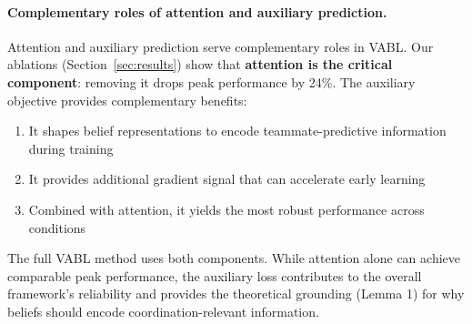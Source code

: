 \documentclass{article}
\theoremstyle{plain}
\theoremstyle{definition}
\theoremstyle{remark}
\begin{document}
\paragraph{Complementary roles of attention and auxiliary prediction.}
Attention and auxiliary prediction serve complementary roles in VABL. Our ablations (Section~\ref{sec:results}) show that \textbf{attention is the critical component}: removing it drops peak performance by 24\%. The auxiliary objective provides complementary benefits:
\begin{enumerate}
\item It shapes belief representations to encode teammate-predictive information during training
\item It provides additional gradient signal that can accelerate early learning
\item Combined with attention, it yields the most robust performance across conditions
\end{enumerate}
The full VABL method uses both components. While attention alone can achieve comparable peak performance, the auxiliary loss contributes to the overall framework's reliability and provides the theoretical grounding (Lemma 1) for why beliefs should encode coordination-relevant information.
\end{document}
